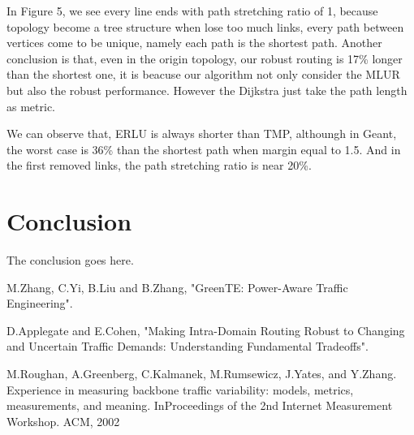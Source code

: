 \documentclass[conference]{IEEEtran}
\begin{document}
In Figure 5, we see every line ends with path stretching ratio of 1, because topology become a tree structure when lose too much links,
every path between vertices come to be unique, namely each path is the shortest path. Another conclusion is that, even in the origin 
topology, our robust routing is 17\% longer than the shortest one, it is beacuse our algorithm not only consider the MLUR but also 
the robust performance. However the Dijkstra just take the path length as metric.

We can observe that, ERLU is always shorter than TMP, althoungh in Geant, the worst case is 36\% than the shortest path when margin 
equal to 1.5. And in the first removed links, the path stretching ratio is near 20\%. 


\section{Conclusion}
The conclusion goes here.

\begin{thebibliography}{1}

M.Zhang, C.Yi, B.Liu and B.Zhang, "GreenTE: Power-Aware Traffic Engineering".

D.Applegate and E.Cohen, "Making Intra-Domain Routing Robust to Changing and Uncertain Traffic Demands: Understanding Fundamental Tradeoffs".

M.Roughan, A.Greenberg, C.Kalmanek, M.Rumsewicz, J.Yates, and Y.Zhang. Experience in measuring backbone traffic variability: models, metrics, measurements, and meaning. InProceedings of the 2nd Internet Measurement Workshop. ACM, 2002
\end{thebibliography}


\end{document}
